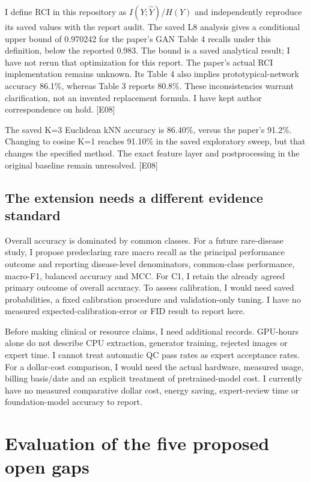 \documentclass[11pt,a4paper]{article}
\newcommand{\ev}[1]{\textcolor{Link}{\textsf{[#1]}}}
\begin{document}
I define RCI in this repository as $I(Y;\widehat{Y})/H(Y)$ and independently
reproduce its saved values with the report audit. The saved L8 analysis gives a
conditional upper bound of 0.970242 for the paper's GAN Table 4 recalls under
this definition, below the reported 0.983. The bound is a saved analytical
result; I have not rerun that optimization for this report. The paper's actual RCI
implementation remains unknown. Its Table 4 also implies prototypical-network
accuracy 86.1\%, whereas Table 3 reports 80.8\%. These inconsistencies warrant
clarification, not an invented replacement formula. I have kept author
correspondence on hold. \ev{E08}\cite{yoo2021}

The saved K=3 Euclidean kNN accuracy is 86.40\%, versus the paper's 91.2\%.
Changing to cosine K=1 reaches 91.10\% in the saved exploratory sweep, but that
changes the specified method. The exact feature layer and postprocessing in
the original baseline remain unresolved. \ev{E08}

\subsection{The extension needs a different evidence standard}

Overall accuracy is dominated by common classes. For a future rare-disease
study, I propose predeclaring rare macro recall as the principal performance
outcome and reporting disease-level denominators, common-class performance,
macro-F1, balanced accuracy and MCC. For C1, I retain the already agreed
primary outcome of overall accuracy. To assess calibration, I would need saved
probabilities, a fixed calibration procedure and validation-only tuning.
I have no measured expected-calibration-error or FID result to report here.

Before making clinical or resource claims, I need additional records.
GPU-hours alone do not describe CPU extraction, generator training, rejected
images or expert time. I cannot treat automatic QC pass rates as expert
acceptance rates. For a dollar-cost comparison, I would need the actual
hardware, measured usage, billing basis/date and an explicit treatment of
pretrained-model cost. I currently have no measured comparative dollar cost,
energy saving, expert-review time or foundation-model accuracy to report.

\section{Evaluation of the five proposed open gaps}
\end{document}
